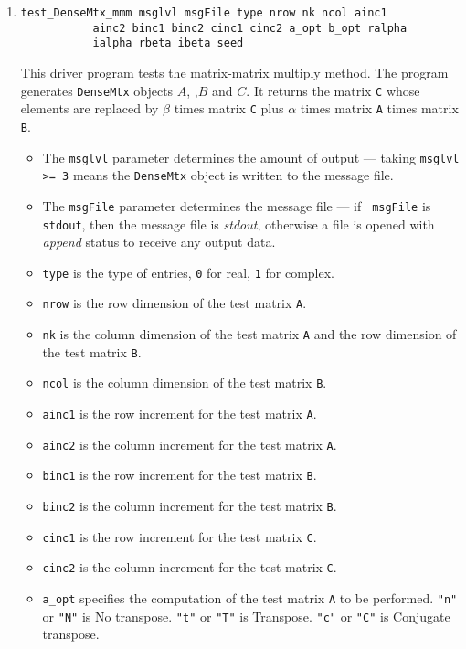 \begin{enumerate}
\item
\begin{verbatim}
test_DenseMtx_mmm msglvl msgFile type nrow nk ncol ainc1
           ainc2 binc1 binc2 cinc1 cinc2 a_opt b_opt ralpha 
           ialpha rbeta ibeta seed 
\end{verbatim}
This driver program tests the matrix-matrix multiply method.
The program generates {\tt DenseMtx} objects $A$,
,$B$ and $C$. It returns the matrix {\tt C} whose
elements are replaced by $\beta$ times matrix {\tt C} plus
$\alpha$ times matrix {\tt A} times matrix {\tt B}.
\par
\begin{itemize}
\item
The {\tt msglvl} parameter determines the amount of output ---
taking {\tt msglvl >= 3} means the {\tt DenseMtx} object is written
to the message file.
\item
The {\tt msgFile} parameter determines the message file --- if {\tt
msgFile} is {\tt stdout}, then the message file is {\it stdout},
otherwise a file is opened with {\it append} status to receive any
output data.
\item
{\tt type} is the type of entries, {\tt 0} for real, {\tt 1} for complex.
\item
{\tt nrow} is the row dimension of the test matrix {\tt A}.
\item
{\tt nk} is the column dimension of the test matrix {\tt A} and
the row dimension of the test matrix {\tt B}.
\item
{\tt ncol} is the column dimension of the test matrix {\tt B}.
\item
{\tt ainc1} is the row increment for the test matrix {\tt A}.
\item
{\tt ainc2} is the column increment for the test matrix {\tt A}.
\item
{\tt binc1} is the row increment for the test matrix {\tt B}.
\item
{\tt binc2} is the column increment for the test matrix {\tt B}.
\item
{\tt cinc1} is the row increment for the test matrix {\tt C}.
\item
{\tt cinc2} is the column increment for the test matrix {\tt C}.
\item
{\tt a\_opt} specifies the computation of the test matrix {\tt A} 
to be performed. 
{\tt "n"} or {\tt "N"} is No transpose.
{\tt "t"} or {\tt "T"} is Transpose. 
{\tt "c"} or {\tt "C"} is Conjugate transpose.

\end{itemize}
\end{enumerate}
